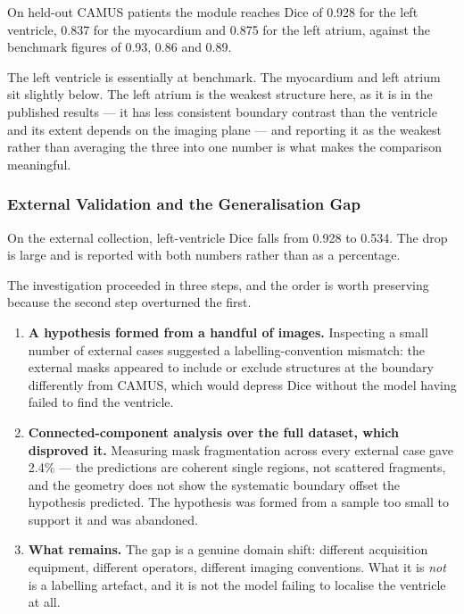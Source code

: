 On held-out CAMUS patients the module reaches Dice of 0.928 for the left ventricle, 0.837 for
the myocardium and 0.875 for the left atrium, against the benchmark figures of 0.93, 0.86 and
0.89.

The left ventricle is essentially at benchmark. The myocardium and left atrium sit slightly
below. The left atrium is the weakest structure here, as it is in the published results ---
it has less consistent boundary contrast than the ventricle and its extent depends on the
imaging plane --- and reporting it as the weakest rather than averaging the three into one
number is what makes the comparison meaningful.

\subsubsection{External Validation and the Generalisation Gap}

On the external collection, left-ventricle Dice falls from 0.928 to 0.534. The drop is large
and is reported with both numbers rather than as a percentage.

The investigation proceeded in three steps, and the order is worth preserving because the
second step overturned the first.

\begin{enumerate}
  \item \textbf{A hypothesis formed from a handful of images.} Inspecting a small number of
        external cases suggested a labelling-convention mismatch: the external masks appeared
        to include or exclude structures at the boundary differently from CAMUS, which would
        depress Dice without the model having failed to find the ventricle.
  \item \textbf{Connected-component analysis over the full dataset, which disproved it.}
        Measuring mask fragmentation across every external case gave 2.4\% --- the predictions
        are coherent single regions, not scattered fragments, and the geometry does not show
        the systematic boundary offset the hypothesis predicted. The hypothesis was formed from
        a sample too small to support it and was abandoned.
  \item \textbf{What remains.} The gap is a genuine domain shift: different acquisition
        equipment, different operators, different imaging conventions. What it is \emph{not} is
        a labelling artefact, and it is not the model failing to localise the ventricle at all.
\end{enumerate}

